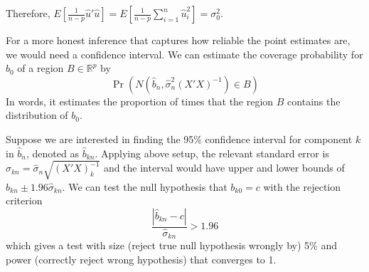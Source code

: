 Therefore, $E\left[\frac{1}{n-p}\hat{u}'\hat{u}\right]=E\left[\frac{1}{n-p}\sum_{i=1}^n \hat{u}_i^2\right]=\sigma_0^2$.\par
For a more honest inference that captures how reliable the point estimates are, we would need a confidence interval. We can estimate the coverage probability for $b_0$ of a region $B\in\mathbb{R}^p$ by
\[
\Pr(N(\hat{b}_n, \hat{\sigma}_n^2(X'X)^{-1})\in B)
\]
In words, it estimates the proportion of times that the region $B$ contains the distribution of $b_0$. \par
Suppose we are interested in finding the 95\% confidence interval for component $k$ in $\hat{b}_n$, denoted as $\hat{b}_{kn}$. Applying above setup, the relevant standard error is $\hat{\sigma}_{kn}=\hat{\sigma}_n\sqrt{(X'X)^{-1}_{k}}$ and the interval would have upper and lower bounds of $\hat{b}_{kn}\pm 1.96\hat{\sigma}_{kn}$. We can test the null hypothesis that $b_{k0}=c$ with the rejection criterion
\[
\frac{|\hat{b}_{kn}-c|}{\hat{\sigma}_{kn}}>1.96
\]
which gives a test with size (reject true null hypothesis wrongly by) 5\% and power (correctly reject wrong hypothesis) that converges to 1. \par
\begin{mdframed}[backgroundcolor=yellow!5] 
\begin{comment}[What is a confidence interval?]
There are some cautions when interpreting the confidence interval. Let $(l,u)$ be the 95\% confidence interval after a sample is drawn. A 95\% confidence interval can be interpreted as saying that \textbf{there is a 95\% probability that the $(l,u)$ confidence interval encompasses the true value}. Notice that this is a probability statement about the confidence interval and not the true value. True value of $\beta_{k0}$ should not be treated as a  random variable. Therefore, it is not necessarily true to say that there is a 95\% probability that $b_{0k}$ is included in a particular $(l,u)$ confidence interval. Another way of seeing this is if the sample has been drawn $N$ times, the fraction of calculated confidence intervals (that differs for each draw) which encompasses the true value is 95\%, or that $N\times 0.95$ confidence intervals encompass true parameter.
\end{comment}
\end{mdframed} 
